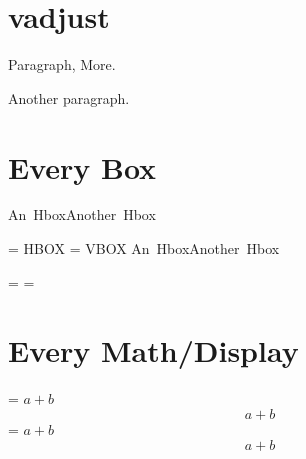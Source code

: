 \documentclass{article}
\begin{document}
\section{vadjust}
Paragraph, More.

Another paragraph.

\section{Every Box}

\def\HBox{ HBOX }
\def\VBox{ VBOX }

\vbox{\hbox{An Hbox}\hbox{Another Hbox}}

\everyhbox={\HBox}
\everyvbox={\VBox}
\vbox{\hbox{An Hbox}\hbox{Another Hbox}}

\everyhbox={}
\everyvbox={}

\section{Every Math/Display}
{
 \everymath={\rightarrow}
 $a+b$
 $$a+b$$
}
{
 \everydisplay={\rightarrow}
 $a+b$
 $$a+b$$
}

\end{document}

